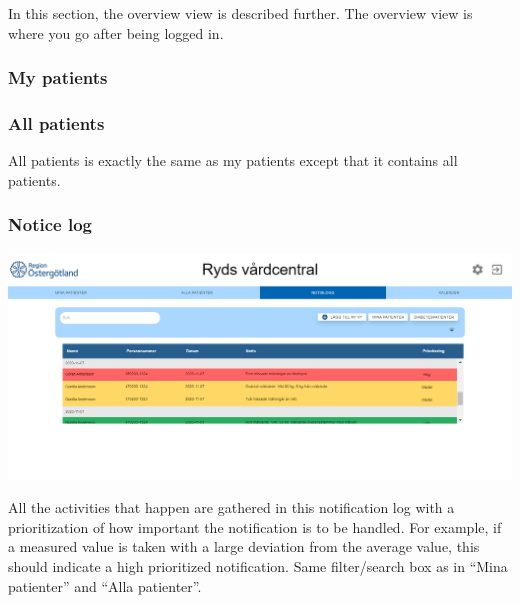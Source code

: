 In this section, the overview view is described further. The overview view is where you go after being logged in.

\subsubsection{My patients}
    

\subsubsection{All patients}
All patients is exactly the same as my patients except that it contains all patients.

\subsubsection{Notice log}
\begin{center}
    \includegraphics[width=\linewidth]{images/Notice_log_image.png}
    \label{fig:figures}
\end{center}
All the activities that happen are gathered in this notification log with a prioritization of how important the notification is to be handled. For example, if a measured value is taken with a large deviation from the average value, this should indicate a high prioritized notification. 
Same filter/search box as in “Mina patienter” and “Alla patienter”.
\\

